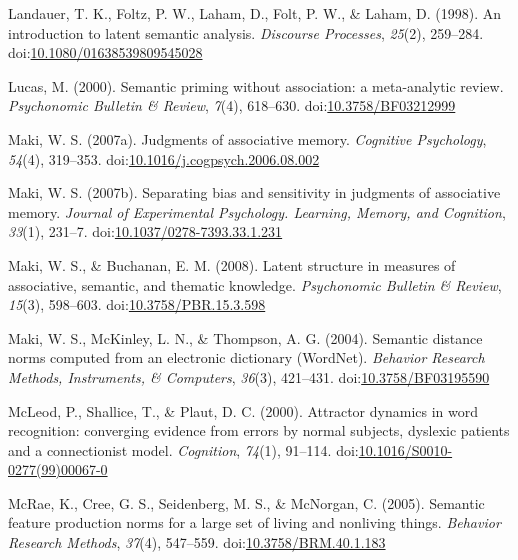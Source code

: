 \documentclass[english,man]{apa6}
\theoremstyle{definition}
\theoremstyle{definition}
\theoremstyle{definition}
\theoremstyle{remark}
\begin{document}
\hypertarget{ref-Landauer1998}{}
Landauer, T. K., Foltz, P. W., Laham, D., Folt, P. W., \& Laham, D.
(1998). An introduction to latent semantic analysis. \emph{Discourse
Processes}, \emph{25}(2), 259--284.
doi:\href{https://doi.org/10.1080/01638539809545028}{10.1080/01638539809545028}

\hypertarget{ref-Lucas2000}{}
Lucas, M. (2000). Semantic priming without association: a meta-analytic
review. \emph{Psychonomic Bulletin \& Review}, \emph{7}(4), 618--630.
doi:\href{https://doi.org/10.3758/BF03212999}{10.3758/BF03212999}

\hypertarget{ref-Maki2007a}{}
Maki, W. S. (2007a). Judgments of associative memory. \emph{Cognitive
Psychology}, \emph{54}(4), 319--353.
doi:\href{https://doi.org/10.1016/j.cogpsych.2006.08.002}{10.1016/j.cogpsych.2006.08.002}

\hypertarget{ref-Maki2007}{}
Maki, W. S. (2007b). Separating bias and sensitivity in judgments of
associative memory. \emph{Journal of Experimental Psychology. Learning,
Memory, and Cognition}, \emph{33}(1), 231--7.
doi:\href{https://doi.org/10.1037/0278-7393.33.1.231}{10.1037/0278-7393.33.1.231}

\hypertarget{ref-Maki2008}{}
Maki, W. S., \& Buchanan, E. M. (2008). Latent structure in measures of
associative, semantic, and thematic knowledge. \emph{Psychonomic
Bulletin \& Review}, \emph{15}(3), 598--603.
doi:\href{https://doi.org/10.3758/PBR.15.3.598}{10.3758/PBR.15.3.598}

\hypertarget{ref-Maki2004}{}
Maki, W. S., McKinley, L. N., \& Thompson, A. G. (2004). Semantic
distance norms computed from an electronic dictionary (WordNet).
\emph{Behavior Research Methods, Instruments, \& Computers},
\emph{36}(3), 421--431.
doi:\href{https://doi.org/10.3758/BF03195590}{10.3758/BF03195590}

\hypertarget{ref-McLeod2000}{}
McLeod, P., Shallice, T., \& Plaut, D. C. (2000). Attractor dynamics in
word recognition: converging evidence from errors by normal subjects,
dyslexic patients and a connectionist model. \emph{Cognition},
\emph{74}(1), 91--114.
doi:\href{https://doi.org/10.1016/S0010-0277(99)00067-0}{10.1016/S0010-0277(99)00067-0}

\hypertarget{ref-McRae2005}{}
McRae, K., Cree, G. S., Seidenberg, M. S., \& McNorgan, C. (2005).
Semantic feature production norms for a large set of living and
nonliving things. \emph{Behavior Research Methods}, \emph{37}(4),
547--559.
doi:\href{https://doi.org/10.3758/BRM.40.1.183}{10.3758/BRM.40.1.183}
\end{document}

